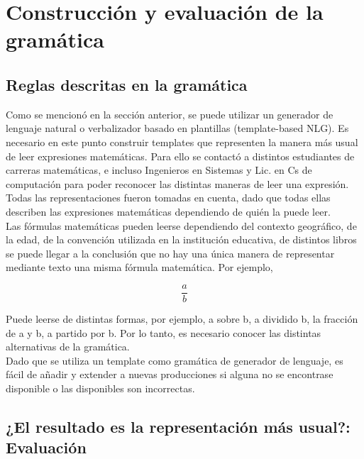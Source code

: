
\chapter{Construcción y evaluación de la gramática}

\label{Chapter4} %


\section{Reglas descritas en la gramática}

Como se mencionó en la sección anterior, se puede utilizar un generador de lenguaje natural o verbalizador basado en plantillas (template-based NLG). Es necesario en este punto construir templates que representen la manera más usual de leer expresiones matemáticas. Para ello se contactó a distintos estudiantes de carreras matemáticas, e incluso Ingenieros en Sistemas y Lic. en Cs de computación para poder reconocer las distintas maneras de leer una expresión. Todas las representaciones fueron tomadas en cuenta, dado que todas ellas describen las expresiones matemáticas dependiendo de quién la puede leer.\\

Las fórmulas matemáticas pueden leerse dependiendo del contexto geográfico, de la edad, de la convención utilizada en la institución educativa, de distintos libros se puede llegar a la conclusión que no hay una única manera de representar mediante texto una misma fórmula matemática.
Por ejemplo,

$$\frac{a}{b}$$

Puede leerse de distintas formas, por ejemplo, a sobre b, a dividido b, la fracción de a y b, a partido por b. Por lo tanto, es necesario conocer las distintas alternativas de la gramática.\\

Dado que se utiliza un template como gramática de generador de lenguaje, es fácil de añadir y extender a nuevas producciones si alguna no se encontrase disponible o las disponibles son incorrectas.\\

\section{¿El resultado es la representación más usual?: Evaluación}


